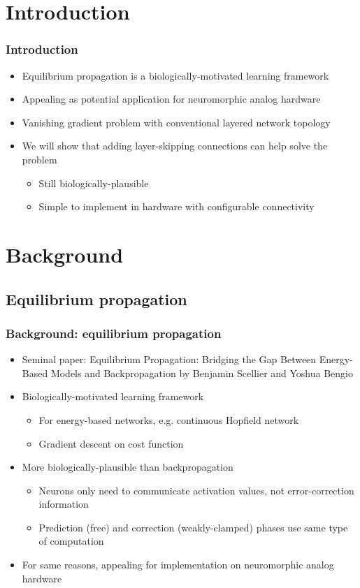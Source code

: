 \documentclass[pdf]{beamer}
\begin{document}
\section{Introduction}
\begin{frame}
	\frametitle{Introduction}
	\begin{itemize}
		\item<1-> Equilibrium propagation is a biologically-motivated learning framework
		\item<2-> Appealing as potential application for neuromorphic analog hardware
		\item<3-> Vanishing gradient problem with conventional layered network topology
		\item<4-> We will show that adding layer-skipping connections can help solve the problem
		\begin{itemize}
			\item<5-> Still biologically-plausible
			\item<6-> Simple to implement in hardware with configurable connectivity
		\end{itemize}
	\end{itemize}
\end{frame}

\section{Background}
\subsection{Equilibrium propagation}
\begin{frame}
	\frametitle{Background: equilibrium propagation}
	\begin{itemize}
		\item<1-> Seminal paper: Equilibrium Propagation: Bridging the Gap Between Energy-Based Models and Backpropagation by Benjamin Scellier and Yoshua Bengio
		\item<2-> Biologically-motivated learning framework
		\begin{itemize}
			\item<3-> For energy-based networks, e.g. continuous Hopfield network
			\item<4-> Gradient descent on cost function
		\end{itemize}
		\item<5-> More biologically-plausible than backpropagation
		\begin{itemize}
			\item<6-> Neurons only need to communicate activation values, not error-correction information
			\item<7-> Prediction (free) and correction (weakly-clamped) phases use same type of computation
		\end{itemize}
		\item<8-> For same reasons, appealing for implementation on neuromorphic analog hardware
	\end{itemize}
\end{frame}
\end{document}
